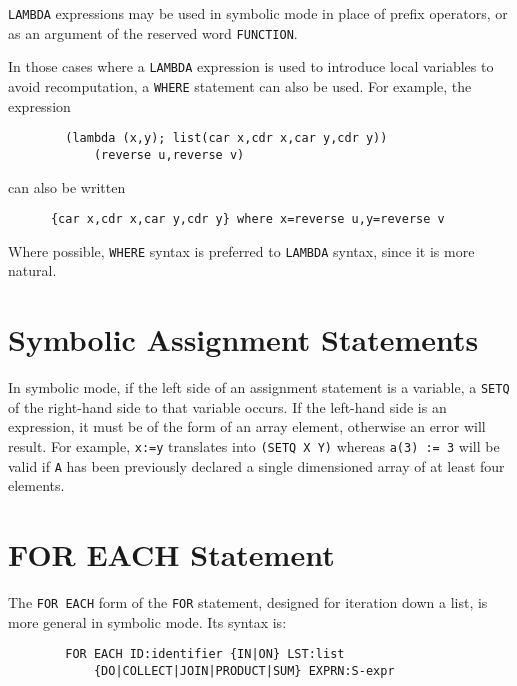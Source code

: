 \documentclass[11pt,letterpaper]{book}
\makeatletter
\newcommand{\underscore}{\_}
\newcommand{\ttindex}[1]{{\renewcommand{\_}{\protect\underscore}%
                          \index{#1@{\tt #1}}}}
\makeatother
\begin{document}
{\tt LAMBDA} expressions may be used in symbolic mode in place of prefix
operators, or as an argument of the reserved word {\tt FUNCTION}.

In those cases where a {\tt LAMBDA} expression is used to introduce local
variables to avoid recomputation, a {\tt WHERE} statement can also be
used.  For example, the expression
{\small\begin{verbatim}
        (lambda (x,y); list(car x,cdr x,car y,cdr y))
            (reverse u,reverse v)
\end{verbatim}}
can also be written
{\small\begin{verbatim}
      {car x,cdr x,car y,cdr y} where x=reverse u,y=reverse v
\end{verbatim}}
Where possible, {\tt WHERE} syntax is preferred to {\tt LAMBDA} syntax,
since it is more natural.

\section{Symbolic Assignment Statements}

In symbolic mode, if the left side of an assignment statement is a
variable, a {\tt SETQ} of the right-hand side to that variable occurs.  If
the left-hand side is an expression, it must be of the form of an array
element, otherwise an error will result.  For example, {\tt x:=y}
translates into {\tt (SETQ X Y)} whereas {\tt a(3) := 3} will be valid if
{\tt A} has been previously declared a single dimensioned array of at
least four elements.

\section{FOR EACH Statement}\ttindex{FOR EACH}

The {\tt FOR EACH} form of the {\tt FOR} statement, designed for iteration
down a list, is more general in symbolic mode.  Its syntax is:

{\small\begin{verbatim}
        FOR EACH ID:identifier {IN|ON} LST:list
            {DO|COLLECT|JOIN|PRODUCT|SUM} EXPRN:S-expr
\end{verbatim}}
\end{document}
